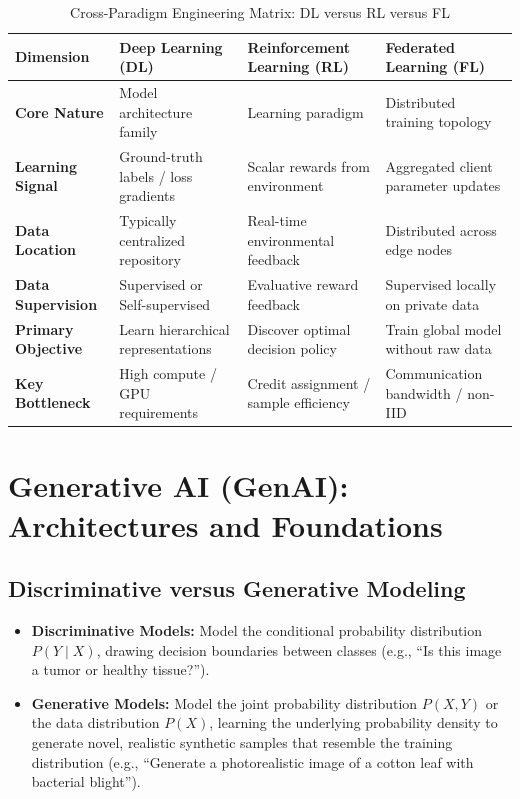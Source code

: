 \begin{table}[htbp]
\centering
\small
\caption{Cross-Paradigm Engineering Matrix: DL versus RL versus FL}
\label{tab:dl_rl_fl_matrix}
\begin{tabularx}{\textwidth}{p{3.2cm}XXX}
\toprule
\textbf{Dimension} & \textbf{Deep Learning (DL)} & \textbf{Reinforcement Learning (RL)} & \textbf{Federated Learning (FL)} \\
\midrule
\textbf{Core Nature} & Model architecture family & Learning paradigm & Distributed training topology \\
\textbf{Learning Signal} & Ground-truth labels / loss gradients & Scalar rewards from environment & Aggregated client parameter updates \\
\textbf{Data Location} & Typically centralized repository & Real-time environmental feedback & Distributed across edge nodes \\
\textbf{Data Supervision} & Supervised or Self-supervised & Evaluative reward feedback & Supervised locally on private data \\
\textbf{Primary Objective} & Learn hierarchical representations & Discover optimal decision policy & Train global model without raw data \\
\textbf{Key Bottleneck} & High compute / GPU requirements & Credit assignment / sample efficiency & Communication bandwidth / non-IID \\
\bottomrule
\end{tabularx}
\end{table}


\section{Generative AI (GenAI): Architectures and Foundations}
\label{sec:generative_ai}

\subsection{Discriminative versus Generative Modeling}
\begin{itemize}
    \item \textbf{Discriminative Models:} Model the conditional probability distribution $P(Y \mid X)$, drawing decision boundaries between classes (e.g., ``Is this image a tumor or healthy tissue?'').
    \item \textbf{Generative Models:} Model the joint probability distribution $P(X, Y)$ or the data distribution $P(X)$, learning the underlying probability density to generate novel, realistic synthetic samples that resemble the training distribution (e.g., ``Generate a photorealistic image of a cotton leaf with bacterial blight'').
\end{itemize}

